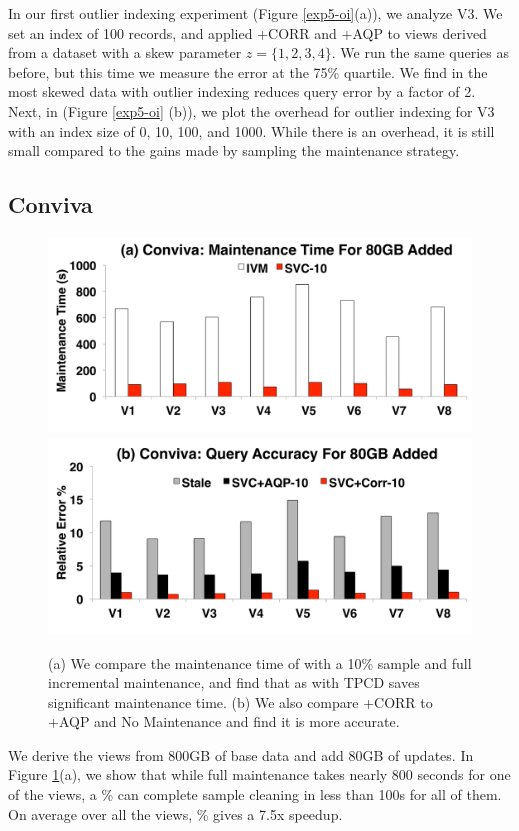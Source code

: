 In our first outlier indexing experiment (Figure \ref{exp5-oi}(a)), we analyze V3.
We set an index of 100 records, and applied \svcnospace+CORR and \svcnospace+AQP to views derived from a dataset with a skew parameter $z=\{1,2,3,4\}$. 
We run the same queries as before, but this time we measure the error at the 75\% quartile.
We find in the most skewed data \svc with outlier indexing reduces query error by a factor of 2.
Next, in \big(Figure \ref{exp5-oi} (b)\big), we plot the overhead for outlier indexing for V3 with an index size of 0, 10, 100, and 1000.
While there is an overhead, it is still small compared to the gains made by sampling the maintenance strategy.

\subsection{Conviva}
\begin{figure}[t]
\centering
 \includegraphics[scale=0.14]{exp/con_3.pdf}
 \includegraphics[scale=0.14]{exp/con_4.pdf} \vspace{-1.0em}
 \caption{(a) We compare the maintenance time of \svc with a 10\% sample and full incremental maintenance, and find that as with TPCD \svc saves significant maintenance time. (b) We also compare \svcnospace+CORR to \svcnospace+AQP and No Maintenance and find it is more accurate. \label{conv-1}}
\end{figure}
We derive the views from 800GB of base data and add 80GB of updates.
In Figure \ref{conv-1}(a), we show that while full maintenance takes nearly 800 seconds for one of the views, a \% can complete sample cleaning in less than 100s for all of them.
On average over all the views, \% gives a 7.5x speedup.

